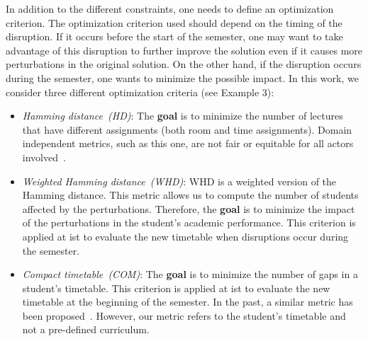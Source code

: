 \documentclass[twocolumn,natbib]{svjour3}          %
\newcounter{constraint}
\begin{document}
In addition to the different constraints, one needs to define an optimization criterion. The optimization criterion used should depend on the timing of the disruption. If it occurs before the start of the semester, one may want to take advantage of this disruption to further improve the solution even if it causes more perturbations in the original solution. On the other hand, if the disruption occurs during the semester, one wants to minimize the possible impact. In this work, we consider three different optimization criteria (see Example 3):
\begin{itemize}
    \item \textit{Hamming distance~(HD)}: The \textbf{goal} is to minimize the number of lectures that have different assignments (both room and time assignments). Domain independent metrics, such as this one, are not fair or equitable for all actors involved~\citep{APhillips2017}.
    \item \textit{Weighted Hamming distance~(WHD)}: WHD is a weighted version of the Hamming distance.  This metric allows us to compute the number of students affected by the perturbations. Therefore, the \textbf{goal} is to minimize the impact of the perturbations in the student's academic performance. This criterion is applied at \gls{ist} to evaluate the new timetable when disruptions occur during the semester. 
    \item \textit{Compact timetable~(COM)}: The \textbf{goal} is to minimize the number of gaps in a student's timetable. This criterion is applied at \gls{ist} to evaluate the new timetable at the beginning of the semester. In the past, a similar metric has been proposed~\citep{DBLP:journals/eor/VermuytenLMB16,DBLP:journals/cor/BurkeMPR10}. However, our metric refers to the student's timetable and not a pre-defined curriculum. 
\end{itemize}

 
\end{document}

